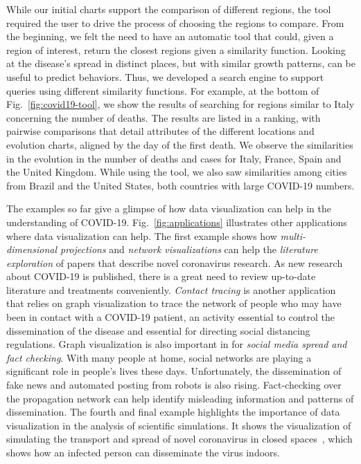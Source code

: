 \documentclass[10pt,journal,compsoc]{IEEEtran}
\newcommand{\cv}{COVID-19\xspace}
\begin{document}
While our initial charts support the comparison of different regions, the tool required the user to drive the process of choosing the regions to compare. From the beginning, we felt the need to have an automatic tool that could, given a region of interest, return the closest regions given a similarity function. Looking at the disease's spread in distinct places, but with similar growth patterns, can be useful to predict behaviors. Thus, we developed a search engine to support queries using different similarity functions. For example, at the bottom of Fig.~\ref{fig:covid19-tool}, we show the results of searching for regions similar to Italy concerning the number of deaths. The results are listed in a ranking, with pairwise comparisons that detail attributes of the different locations and evolution charts, aligned by the day of the first death. We observe the similarities in the evolution in the number of deaths and cases for Italy, France, Spain and the United Kingdom. While using the tool, we also saw similarities among cities from Brazil and the United States, both countries with large \cv numbers.

The examples so far give a glimpse of how data visualization can help in the understanding of \cv. Fig.~\ref{fig:applications} illustrates other applications where data visualization can help.
The first example shows how \emph{multi-dimensional projections} and \emph{network visualizations} can help the \emph{literature exploration} of papers that describe novel coronavirus research. As new research about \cv is published, there is a great need to review up-to-date literature and treatments conveniently.
\emph{Contact tracing} is another application that relies on graph visualization to trace the network of people who may have been in contact with a \cv patient, an activity essential to control the dissemination of the disease and essential for directing social distancing regulations. Graph visualization is also important in for \emph{social media spread and fact checking}. With many people at home, social networks are playing a significant role in people's lives these days. Unfortunately, the dissemination of fake news and automated posting from robots is also rising. Fact-checking over the propagation network can help identify misleading information and patterns of dissemination. The fourth and final example highlights the importance of data visualization in the analysis of scientific simulations. It shows the visualization of simulating the transport and spread of novel coronavirus in closed spaces~\cite{VUORINEN2020}, which shows how an infected person can disseminate the virus indoors.
\end{document}
